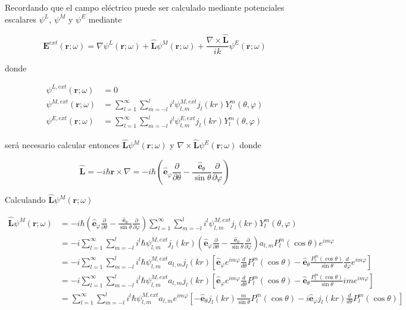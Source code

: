 \documentclass[a4paper,10pt]{article}
\newcommand{\hatbf}[1] {\hat{\mathbf{#1}}}	%
\newcommand{\parcial}[1]{\frac{\partial}{\partial {#1}}}	%
\begin{document}
Recordando que el campo eléctrico puede ser calculado mediante potenciales escalares $\psi^L$, $\psi^M$ y $\psi^E$ mediante

\begin{equation}
\textbf{E}^{ext}(\textbf{r};\omega)=\nabla\psi^L(\textbf{r};\omega)+\hatbf{L}\psi^M(\textbf{r};\omega)+\frac{\nabla\times\hatbf{L}}{ik}\psi^E(\textbf{r};\omega)
\label{Eq4.1}
\end{equation}

donde

\begin{subequations}
\begin{align}
\psi^{L,ext}(\textbf{r};\omega)	&=0	\\
\psi^{M,ext}(\textbf{r};\omega)	&=\sum_{l=1}^{\infty}\sum_{m=-l}^{l}i^l\psi_{l,m}^{M,ext}j_l(kr)Y_l^m(\theta,\varphi)	\\
\psi^{E,ext}(\textbf{r};\omega)	&=\sum_{l=1}^{\infty}\sum_{m=-l}^{l}i^l\psi_{l,m}^{E,ext}j_l(kr)Y_l^m(\theta,\varphi)
\end{align}
\end{subequations}

será necesario calcular entonces $\hatbf{L}\psi^M(\textbf{r};\omega)$ y $\nabla\times\hatbf{L}\psi^E(\textbf{r};\omega)$ donde

\begin{equation}
\hatbf{L}=-i\hbar\textbf{r}\times\nabla=-i\hbar\left(\hatbf{e}_{\varphi} \parcial{\theta} -\frac{\hatbf{e}_{\theta}}{\sin\theta}\parcial{\varphi}\right)
\end{equation}

Calculando $\hatbf{L}\psi^M(\textbf{r};\omega)$

\begin{subequations}
\begin{align}
\hatbf{L}\psi^M(\textbf{r};\omega)
&=-i\hbar\left(\hatbf{e}_{\varphi} \parcial{\theta} -\frac{\hatbf{e}_{\theta}}{\sin\theta}\parcial{\varphi}\right)\sum_{l=1}^{\infty}\sum_{m=-l}^{l}i^l\psi_{l,m}^{M,ext}j_l(kr)Y_l^m(\theta,\varphi)\\
&=-i\sum_{l=1}^{\infty}\sum_{m=-l}^{l}i^l\hbar\psi_{l,m}^{M,ext}j_l(kr)\left(\hatbf{e}_{\varphi} \parcial{\theta} -\frac{\hatbf{e}_{\theta}}{\sin\theta}\parcial{\varphi}\right)a_{l,m}P_l^m(\cos\theta)e^{im\varphi}	\\
&=-i\sum_{l=1}^{\infty}\sum_{m=-l}^{l}i^l\hbar\psi_{l,m}^{M,ext}a_{l,m}j_l(kr)\left[\hatbf{e}_{\varphi} e^{im\varphi}\frac{d}{d\theta}P_l^m(\cos\theta) -\hatbf{e}_{\theta}\frac{P_l^m(\cos\theta)}{\sin\theta}\frac{d}{d\varphi}e^{im\varphi}\right]	\\
&=-i\sum_{l=1}^{\infty}\sum_{m=-l}^{l}i^l\hbar\psi_{l,m}^{M,ext}a_{l,m}j_l(kr)\left[\hatbf{e}_{\varphi} e^{im\varphi}\frac{d}{d\theta}P_l^m(\cos\theta)-\hatbf{e}_{\theta}\frac{P_l^m(\cos\theta)}{\sin\theta}ime^{im\varphi}\right]	\\
&=\sum_{l=1}^{\infty}\sum_{m=-l}^{l}i^l\hbar\psi_{l,m}^{M,ext}a_{l,m}e^{im\varphi}\left[-\hatbf{e}_{\theta}j_l(kr)\frac{m}{\sin\theta}P_l^m(\cos\theta)-i\hatbf{e}_{\varphi}j_l(kr)\frac{d}{d\theta}P_l^m(\cos\theta)\right]
\end{align}
\label{Eq4.4}
\end{subequations}
\end{document}
